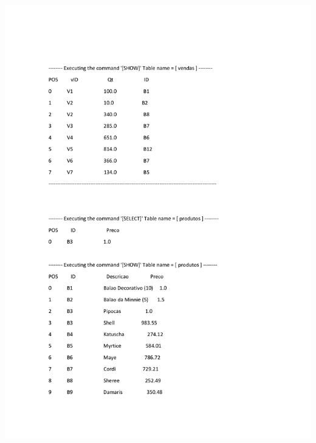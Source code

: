 \documentclass{article}
\begin{document}
\noindent
\includegraphics[width=1.3\textwidth]{4}
\end{document}
